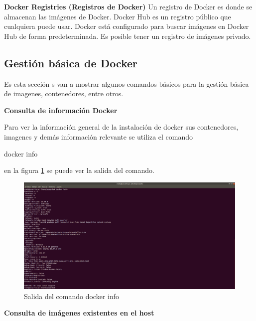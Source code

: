\textbf{Docker Registries (Registros de Docker)}
Un registro de Docker es donde se almacenan las imágenes de Docker. Docker Hub es un registro público que cualquiera puede usar. Docker está configurado para buscar imágenes en Docker Hub de forma predeterminada. Es posible tener un registro de imágenes privado. \parencite{Docker2018}



\subsection{Gestión básica de Docker}

Es esta sección s van a mostrar algunos comandos básicos para la gestión básica de imagenes, contenedores, entre otros.

\textbf{Consulta de información Docker}

Para ver la información general de la instalación de docker sus contenedores, imagenes y demás información relevante se utiliza el comando \begin{commandshell}docker info\end{commandshell} 
en la figura \ref{fig:DockerGestion1} se puede ver la salida del comando.

\begin{figure}[!hbtp]
	\centering
	\includegraphics[width=\linewidth]{Trabajo/RecursosEducativos/RE05_Docker/Gestion_basica/REDocker_Gestion1.png}
	\vspace{-0.2cm}
	\caption{Salida del comando docker info}
	\label{fig:DockerGestion1}
\end{figure}
\textbf{Consulta de imágenes existentes en el host}

